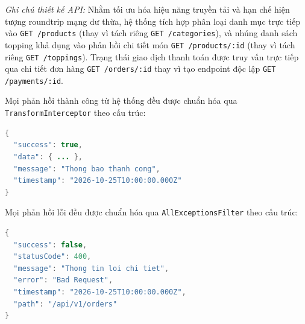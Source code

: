 \noindent\textit{Ghi chú thiết kế API:} Nhằm tối ưu hóa hiệu năng truyền tải và hạn chế hiện tượng roundtrip mạng dư thừa, hệ thống tích hợp phân loại danh mục trực tiếp vào \texttt{GET /products} (thay vì tách riêng \texttt{GET /categories}), và nhúng danh sách topping khả dụng vào phản hồi chi tiết món \texttt{GET /products/:id} (thay vì tách riêng \texttt{GET /toppings}). Trạng thái giao dịch thanh toán được truy vấn trực tiếp qua chi tiết đơn hàng \texttt{GET /orders/:id} thay vì tạo endpoint độc lập \texttt{GET /payments/:id}.

Mọi phản hồi thành công từ hệ thống đều được chuẩn hóa qua \texttt{TransformInterceptor} theo cấu trúc:
\begin{lstlisting}[language=Java]
{
  "success": true,
  "data": { ... },
  "message": "Thong bao thanh cong",
  "timestamp": "2026-10-25T10:00:00.000Z"
}
\end{lstlisting}

Mọi phản hồi lỗi đều được chuẩn hóa qua \texttt{AllExceptionsFilter} theo cấu trúc:
\begin{lstlisting}[language=Java]
{
  "success": false,
  "statusCode": 400,
  "message": "Thong tin loi chi tiet",
  "error": "Bad Request",
  "timestamp": "2026-10-25T10:00:00.000Z",
  "path": "/api/v1/orders"
}
\end{lstlisting}

